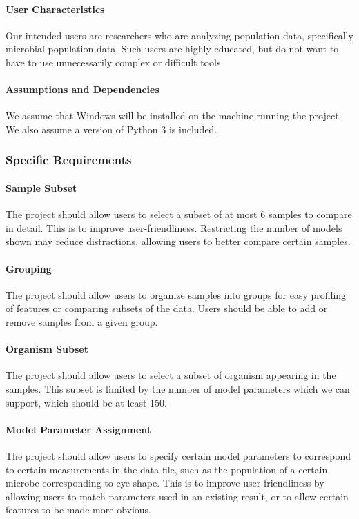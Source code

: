 \documentclass[letterpaper,10pt, onecolumn, draftclsnofoot]{IEEEtran}
\begin{document}
\paragraph{User Characteristics}
Our intended users are researchers who are analyzing population data, specifically microbial population data. Such users are highly educated, but do not want to have to use unnecessarily complex or difficult tools.

\paragraph{Assumptions and Dependencies}
We assume that Windows will be installed on the machine running the project. We also assume a version of Python 3 is included.

\subsubsection{Specific Requirements}

\paragraph{Sample Subset}
The project should allow users to select a subset of at most 6 samples to compare in detail. This is to improve user-friendliness. Restricting the number of models shown may reduce distractions, allowing users to better compare certain samples. 

\paragraph{Grouping}
The project should allow users to organize samples into groups for easy profiling of features or comparing subsets of the data. Users should be able to add or remove samples from a given group.

\paragraph{Organism Subset}
The project should allow users to select a subset of organism appearing in the samples. This subset is limited by the number of model parameters which we can support, which should be at least 150. 

\paragraph{Model Parameter Assignment}
The project should allow users to specify certain model parameters to correspond to certain measurements in the data file, such as the population of a certain microbe corresponding to eye shape. This is to improve user-friendliness by allowing users to match parameters used in an existing result, or to allow certain features to be made more obvious.
\end{document}
